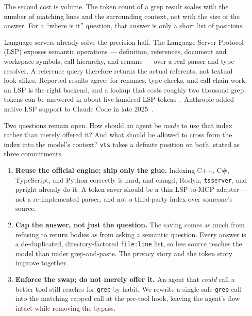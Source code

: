 \documentclass[11pt]{article}
\begin{document}
The second cost is volume. The token count of a grep result scales with the number
of matching lines and the surrounding context, not with the size of the answer.
For a ``where is it'' question, that answer is only a short list of positions.

Language servers already solve the precision half. The Language Server Protocol
(LSP) exposes semantic operations --- definition, references, document and
workspace symbols, call hierarchy, and rename --- over a real parser and type
resolver. A reference query therefore returns the actual referents, not textual
look-alikes. Reported results agree: for renames, type checks, and call-chain work,
an LSP is the right backend, and a lookup that costs roughly two thousand grep
tokens can be answered in about five hundred LSP
tokens~\cite{lsp-medium,semble-hn}. Anthropic added native LSP support to Claude
Code in late 2025~\cite{anthropic-lsp}.

Two questions remain open. How should an agent be \emph{made} to use that index
rather than merely offered it? And what should be allowed to cross from the index
into the model's context? \texttt{vts} takes a definite position on both, stated as
three commitments.

\begin{enumerate}
  \item \textbf{Reuse the official engine; ship only the glue.} Indexing C++, C\#,
  TypeScript, and Python correctly is hard, and clangd, Roslyn, \texttt{tsserver},
  and pyright already do it. A token saver should be a thin LSP-to-MCP adapter ---
  not a re-implemented parser, and not a third-party index over someone's source.

  \item \textbf{Cap the answer, not just the question.} The saving comes as much
  from refusing to return bodies as from asking a semantic question. Every answer
  is a de-duplicated, directory-factored \texttt{file:line} list, so less source
  reaches the model than under grep-and-paste. The privacy story and the token
  story improve together.

  \item \textbf{Enforce the swap; do not merely offer it.} An agent that
  \emph{could} call a better tool still reaches for \texttt{grep} by habit. We
  rewrite a single safe \texttt{grep} call into the matching capped call at the
  pre-tool hook, leaving the agent's flow intact while removing the bypass.
\end{enumerate}
\end{document}
